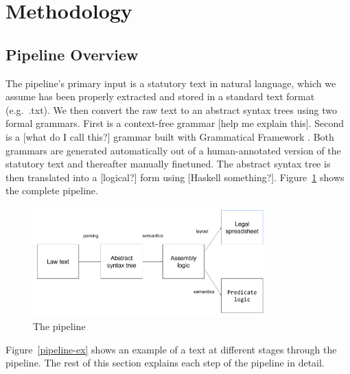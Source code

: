\documentclass{IOS-Book-Article}
\begin{document}
\section{Methodology}
\label{sec:methods}

\subsection{Pipeline Overview}

The pipeline's primary input is a statutory text in natural language, which we assume has been properly extracted and stored in a standard text format (e.g.\ .txt). We then convert the raw text to an abstract syntax trees using two formal grammars. First is a context-free grammar [help me explain this]. Second is a [what do I call this?] grammar built with Grammatical Framework \cite{}. Both grammars are generated automatically out of a human-annotated version of the statutory text and thereafter manually finetuned. The abstract syntax tree is then translated into a [logical?] form using [Haskell something?]. Figure~\ref{pipeline} shows the complete pipeline.


\begin{figure}
    \includegraphics[width=0.8\textwidth]{pipeline.png}
\caption{The pipeline}
\label{pipeline}
\end{figure}

Figure~\ref{pipeline-ex} shows an example of a text at different stages through the pipeline. The rest of this section explains each step of the pipeline in detail.

\end{document}
